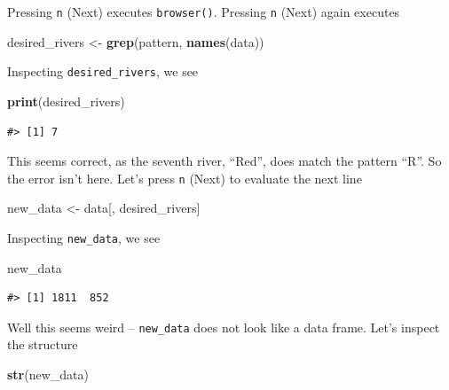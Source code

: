 \documentclass[
]{book}
\newenvironment{Shaded}{\begin{snugshade}}{\end{snugshade}}
\newcommand{\KeywordTok}[1]{\textcolor[rgb]{0.13,0.29,0.53}{\textbf{#1}}}
\newcommand{\NormalTok}[1]{#1}
\newcommand{\StringTok}[1]{\textcolor[rgb]{0.31,0.60,0.02}{#1}}
\begin{document}
Pressing \texttt{n} (Next) executes \texttt{browser()}. Pressing \texttt{n} (Next) again executes

\begin{Shaded}
\begin{Highlighting}[]
\NormalTok{desired_rivers <-}\StringTok{ }\KeywordTok{grep}\NormalTok{(pattern, }\KeywordTok{names}\NormalTok{(data))}
\end{Highlighting}
\end{Shaded}

Inspecting \texttt{desired\_rivers}, we see

\begin{Shaded}
\begin{Highlighting}[]
\KeywordTok{print}\NormalTok{(desired_rivers)}
\end{Highlighting}
\end{Shaded}

\begin{verbatim}
#> [1] 7
\end{verbatim}

This seems correct, as the seventh river, ``Red'', does match the pattern ``R''. So the error isn't here. Let's press \texttt{n} (Next) to evaluate the next line

\begin{Shaded}
\begin{Highlighting}[]
\NormalTok{new_data <-}\StringTok{ }\NormalTok{data[, desired_rivers]}
\end{Highlighting}
\end{Shaded}

Inspecting \texttt{new\_data}, we see

\begin{Shaded}
\begin{Highlighting}[]
\NormalTok{new_data}
\end{Highlighting}
\end{Shaded}

\begin{verbatim}
#> [1] 1811  852
\end{verbatim}

Well this seems weird -- \texttt{new\_data} does not look like a data frame. Let's inspect the structure

\begin{Shaded}
\begin{Highlighting}[]
\KeywordTok{str}\NormalTok{(new_data)}
\end{Highlighting}
\end{Shaded}
\end{document}
